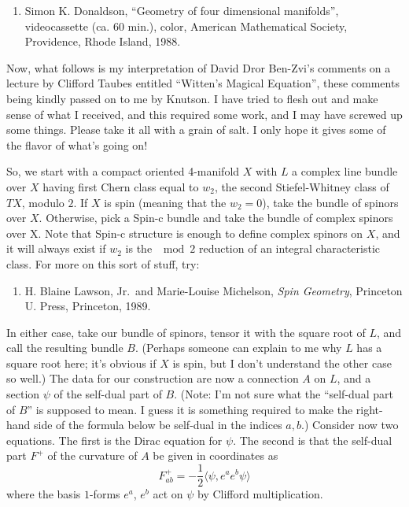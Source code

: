 \documentclass{article}
\def\tightlist{}
\begin{document}
\begin{enumerate}
\def\labelenumi{\arabic{enumi})}
\setcounter{enumi}{1}
\tightlist
\item
   Simon K. Donaldson, ``Geometry of four dimensional manifolds'', 
  videocassette (ca. 60 min.), color, American Mathematical
  Society, Providence, Rhode Island, 1988.
\end{enumerate}

Now, what follows is my interpretation of David Dror Ben-Zvi's comments
on a lecture by Clifford Taubes entitled ``Witten's Magical Equation'',
these comments being kindly passed on to me by Knutson. I have tried to
flesh out and make sense of what I received, and this required some
work, and I may have screwed up some things. Please take it all with a
grain of salt. I only hope it gives some of the flavor of what's going
on!

So, we start with a compact oriented 4-manifold \(X\) with \(L\) a
complex line bundle over \(X\) having first Chern class equal to
\(w_2\), the second Stiefel-Whitney class of \(TX\), modulo \(2\). If
\(X\) is spin (meaning that the \(w_2 = 0\)), take the bundle of spinors
over \(X\). Otherwise, pick a Spin-c bundle and take the bundle of
complex spinors over X. Note that Spin-c structure is enough to define
complex spinors on \(X\), and it will always exist if \(w_2\) is the
\(\mod 2\) reduction of an integral characteristic class. For more on
this sort of stuff, try:

\begin{enumerate}
\def\labelenumi{\arabic{enumi})}
\setcounter{enumi}{2}
\tightlist
\item
  H. Blaine Lawson, Jr.~and Marie-Louise
  Michelson, \emph{Spin Geometry}, Princeton U. Press, Princeton, 1989.
\end{enumerate}

In either case, take our bundle of spinors, tensor it with the square
root of \(L\), and call the resulting bundle \(B\). (Perhaps someone can
explain to me why \(L\) has a square root here; it's obvious if \(X\) is
spin, but I don't understand the other case so well.) The data for our
construction are now a connection \(A\) on \(L\), and a section \(\psi\)
of the self-dual part of \(B\). (Note: I'm not sure what the ``self-dual
part of \(B\)'' is supposed to mean. I guess it is something required to
make the right-hand side of the formula below be self-dual in the
indices \(a,b\).) Consider now two equations. The first is the Dirac
equation for \(\psi\). The second is that the self-dual part \(F^+\) of
the curvature of \(A\) be given in coordinates as
\[F^+_{ab} = -\frac12 \langle\psi, e^a e^b \psi\rangle\] where the basis
\(1\)-forms \(e^a\), \(e^b\) act on \(\psi\) by Clifford multiplication.
\end{document}
